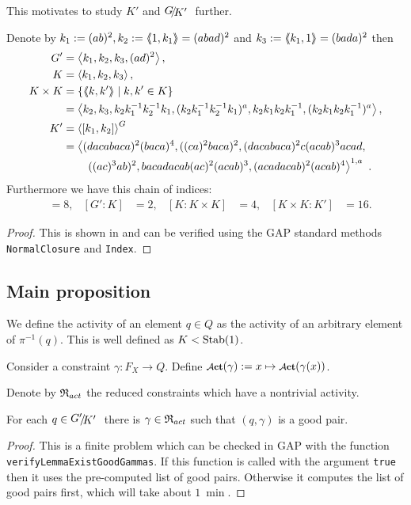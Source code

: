 \documentclass[a4paper,12pt]{article}
\begin{document}
This motivates to study $K'$ and $\RNK{G}{K'}$ further.
\begin{lem} \label{lem:subgroupsOfG}
Denote by $k_1 := (ab)^2, k_2:=\langle\negthickspace\langle1,k_1\rangle\negthickspace\rangle = (abad)^2$ and $k_3:=\langle\negthickspace\langle k_1,1\rangle\negthickspace\rangle = (bada)^2$ then 
 \begin{align*}
  G' &= \left< k_1,k_2,k_3,(ad)^2\right>, \\
  K &= \left< k_1,k_2,k_3\right>, \\
  K\times K &= \{\langle\negthickspace\langle k,k'\rangle\negthickspace\rangle \mid k,k'\in K\} \\&= \left< k_2,k_3,k_2k_1^{-1}k_2^{-1}k_1,(k_2k_1^{-1}k_2^{-1}k_1)^a,k_2k_1k_2k_1^{-1},(k_2k_1k_2k_1^{-1})^a  \right>,\\
  K' &= \left< [k_1,k_2] \right>^G \\ 
  &= \left<(dacabaca)^2(baca)^4,((ca)^2baca)^2,(dacabaca)^2c(acab)^3acad,\right.\\
  &\qquad\left.((ac)^3ab)^2, bacadacab(ac)^2(acab)^3, (acadacab)^2(acab)^4\right>^{1,a}\ .
 \end{align*}
Furthermore we have this chain of indices:
\begin{align*}
  [G:G']&=8, & [G':K]&=2, &[K:K\times K]&= 4, &[K\times K:K']&=16. 
\end{align*}
\end{lem}
\begin{proof}
 This is shown in \cite{Bartholdi:BranchGroups} and can be verified using the GAP standard methods
 \lstinline{NormalClosure} and \lstinline{Index}. 
\end{proof}

\subsection{Main proposition}
\begin{defi}
 We define the activity of an element $q\in Q$ as the activity of an arbitrary element of $\pi^{-1}(q)$. 
 This is well defined as $K<\textup{Stab}(1)$. 
 
 Consider a constraint $\gamma\colon F_X \to Q$. 
 Define $\act(\gamma):= x \mapsto \act(\gamma(x))$.
 
 Denote by $\mathfrak{R}_{act}$ the reduced constraints which have a nontrivial activity.
\end{defi}

\begin{lem} \label{lem:existsGoodGamma}
 For each $q\in\RNK{G'}{K'}$ there is $\gamma\in \mathfrak{R}_{act}$ such that $(q,\gamma)$ is a 
 good pair.
\end{lem}
\begin{proof}
 This is a finite problem which can be checked in GAP with the function \lstinline{verifyLemmaExistGoodGammas}.
 If this function is called with the argument \lstinline{true} then it uses the pre-computed list
 of good pairs. Otherwise it computes the list of good pairs first, which will take about $\SI{1}{\min} $.
\end{proof}
\end{document}
